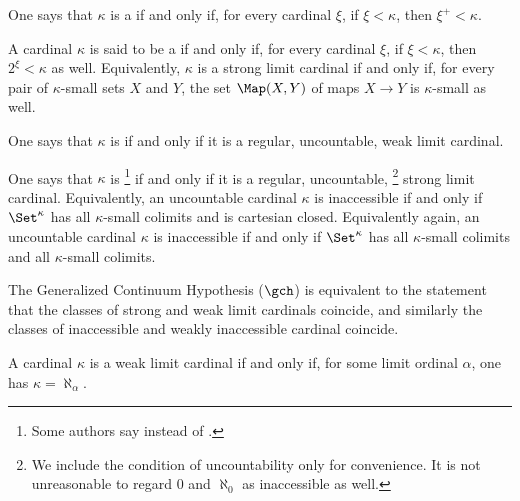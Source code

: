 \begin{definition}
	One says that $ \kappa $ is a  if and only if,
	for every cardinal $ \xi $,
	if $ \xi < \kappa $, then $ \xi^+ < \kappa $.

	A cardinal $\kappa$ is said to be a  if and only if,
	for every cardinal $ \xi $,
	if $ \xi < \kappa $, then $ 2^{\xi} < \kappa $ as well.
	Equivalently, $ \kappa $ is a strong limit cardinal if and only if,
	for every pair of $ \kappa $-small sets $ X $ and $ Y $,
	the set $ \Map(X, Y) $ of maps $ X \to Y $ is $ \kappa $-small as well. 

	One says that $\kappa$ is  if and only if
	it is a regular, uncountable, weak limit cardinal.

	One says that $\kappa$ is %
	\footnote{Some authors say 
	instead of .}
	if and only if it is a regular, uncountable,%
	\footnote{We include the condition of uncountability only for convenience.
		It is not unreasonable to regard $ 0 $ and $ \aleph_0 $
		as inaccessible as well.}
	strong limit cardinal.
	Equivalently, an uncountable cardinal $ \kappa $ is inaccessible if and only if
	$ \Set^{\kappa} $ has all $ \kappa $-small colimits and is cartesian closed.
	Equivalently again, an uncountable cardinal $ \kappa $ is inaccessible if and only if 
	$ \Set^{\kappa} $ has all $ \kappa $-small colimits and all $ \kappa $-small colimits.
\end{definition}

The Generalized Continuum Hypothesis ($ \gch $) is equivalent to the statement that
the classes of strong and weak limit cardinals coincide,
and similarly the classes of inaccessible and weakly inaccessible cardinal coincide.

\begin{eg}
	A cardinal $ \kappa $ is a weak limit cardinal if and only if,
	for some limit ordinal $ \alpha $, one has $ \kappa = \aleph_{\alpha} $.
\end{eg}

